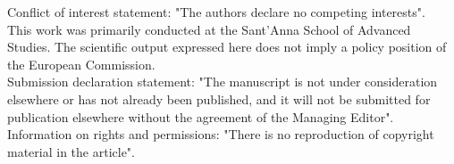 \documentclass[12pt]{article}
\begin{document}


\maketitle
\vskip 2cm
\small
Conflict of interest statement: "The authors declare no competing interests".\\
This work was primarily conducted at the Sant'Anna School of Advanced Studies.
The scientific output expressed here does not imply a policy position of the European Commission.\\
\vskip 1mm
Submission declaration statement: "The manuscript is not under consideration elsewhere or has not already been published, and it will not be submitted for publication elsewhere without the agreement of the Managing Editor".
\vskip 1mm
Information on rights and permissions: "There is no reproduction of copyright
material in the article".

\end{document}
